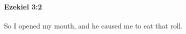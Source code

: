 
		\paragraph{Ezekiel 3:2} %
			\label{EZEKIEL-3-2}

			So I opened my mouth, and he caused me to eat that roll.


